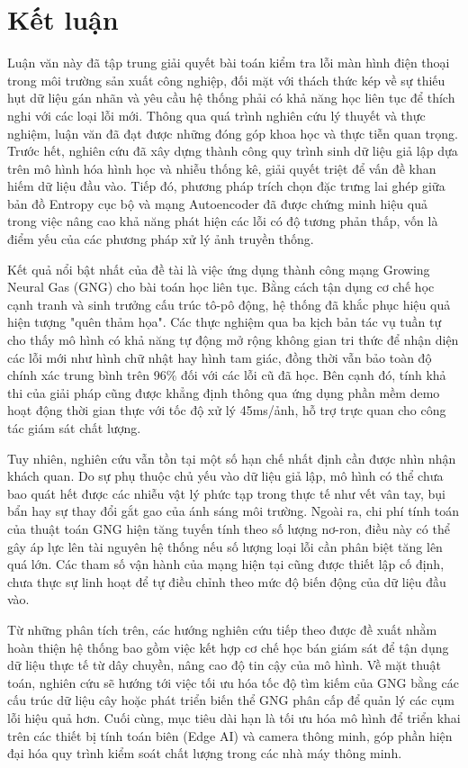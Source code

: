 \chapter*{Kết luận}

Luận văn này đã tập trung giải quyết bài toán kiểm tra lỗi màn hình điện thoại trong môi trường sản xuất công nghiệp, đối mặt với thách thức kép về sự thiếu hụt dữ liệu gán nhãn và yêu cầu hệ thống phải có khả năng học liên tục để thích nghi với các loại lỗi mới. Thông qua quá trình nghiên cứu lý thuyết và thực nghiệm, luận văn đã đạt được những đóng góp khoa học và thực tiễn quan trọng. Trước hết, nghiên cứu đã xây dựng thành công quy trình sinh dữ liệu giả lập dựa trên mô hình hóa hình học và nhiễu thống kê, giải quyết triệt để vấn đề khan hiếm dữ liệu đầu vào. Tiếp đó, phương pháp trích chọn đặc trưng lai ghép giữa bản đồ Entropy cục bộ và mạng Autoencoder đã được chứng minh hiệu quả trong việc nâng cao khả năng phát hiện các lỗi có độ tương phản thấp, vốn là điểm yếu của các phương pháp xử lý ảnh truyền thống.

Kết quả nổi bật nhất của đề tài là việc ứng dụng thành công mạng Growing Neural Gas (GNG) cho bài toán học liên tục. Bằng cách tận dụng cơ chế học cạnh tranh và sinh trưởng cấu trúc tô-pô động, hệ thống đã khắc phục hiệu quả hiện tượng "quên thảm họa". Các thực nghiệm qua ba kịch bản tác vụ tuần tự cho thấy mô hình có khả năng tự động mở rộng không gian tri thức để nhận diện các lỗi mới như hình chữ nhật hay hình tam giác, đồng thời vẫn bảo toàn độ chính xác trung bình trên 96\% đối với các lỗi cũ đã học. Bên cạnh đó, tính khả thi của giải pháp cũng được khẳng định thông qua ứng dụng phần mềm demo hoạt động thời gian thực với tốc độ xử lý 45ms/ảnh, hỗ trợ trực quan cho công tác giám sát chất lượng.

Tuy nhiên, nghiên cứu vẫn tồn tại một số hạn chế nhất định cần được nhìn nhận khách quan. Do sự phụ thuộc chủ yếu vào dữ liệu giả lập, mô hình có thể chưa bao quát hết được các nhiễu vật lý phức tạp trong thực tế như vết vân tay, bụi bẩn hay sự thay đổi gắt gao của ánh sáng môi trường. Ngoài ra, chi phí tính toán của thuật toán GNG hiện tăng tuyến tính theo số lượng nơ-ron, điều này có thể gây áp lực lên tài nguyên hệ thống nếu số lượng loại lỗi cần phân biệt tăng lên quá lớn. Các tham số vận hành của mạng hiện tại cũng được thiết lập cố định, chưa thực sự linh hoạt để tự điều chỉnh theo mức độ biến động của dữ liệu đầu vào.

Từ những phân tích trên, các hướng nghiên cứu tiếp theo được đề xuất nhằm hoàn thiện hệ thống bao gồm việc kết hợp cơ chế học bán giám sát để tận dụng dữ liệu thực tế từ dây chuyền, nâng cao độ tin cậy của mô hình. Về mặt thuật toán, nghiên cứu sẽ hướng tới việc tối ưu hóa tốc độ tìm kiếm của GNG bằng các cấu trúc dữ liệu cây hoặc phát triển biến thể GNG phân cấp để quản lý các cụm lỗi hiệu quả hơn. Cuối cùng, mục tiêu dài hạn là tối ưu hóa mô hình để triển khai trên các thiết bị tính toán biên (Edge AI) và camera thông minh, góp phần hiện đại hóa quy trình kiểm soát chất lượng trong các nhà máy thông minh.